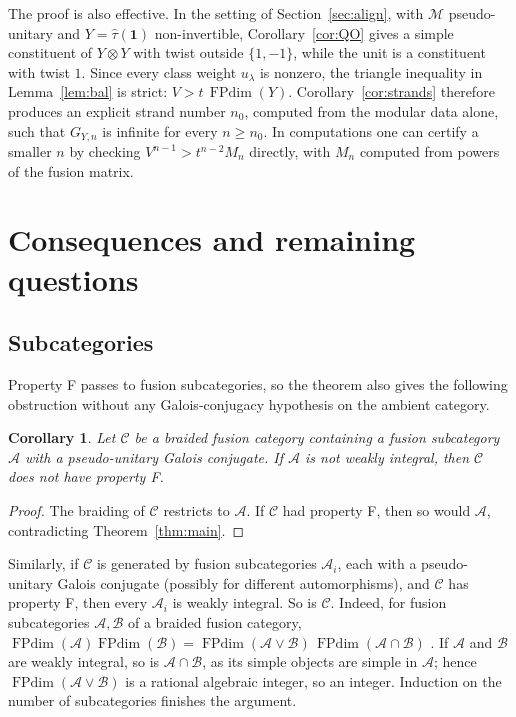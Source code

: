 \documentclass[11pt,oneside]{amsart}
\newtheorem{corollary}[theorem]{Corollary}
\theoremstyle{remark}
\newcommand{\C}{\mathcal C}
\newcommand{\M}{\mathcal M}
\newcommand{\one}{\mathbf 1}
\newcommand{\FP}{\operatorname{FPdim}}
\newcommand{\htau}{\hat\tau}
\begin{document}
The proof is also effective. In the setting of Section~\ref{sec:align}, with
$\M$ pseudo-unitary and $Y=\htau(\one)$ non-invertible, Corollary~\ref{cor:QO}
gives a simple constituent of $Y\otimes Y$ with twist outside $\{1,-1\}$, while
the unit is a constituent with twist $1$. Since every class weight $u_\lambda$
is nonzero, the triangle inequality in Lemma~\ref{lem:bal} is strict:
$V>t\,\FP(Y)$. Corollary~\ref{cor:strands} therefore produces an explicit strand
number $n_0$, computed from the modular data alone, such that $G_{Y,n}$ is
infinite for every $n\ge n_0$. In computations one can certify a smaller $n$ by
checking $V^{n-1}>t^{n-2}M_n$ directly, with $M_n$ computed from powers of the
fusion matrix.

\section{Consequences and remaining questions}\label{sec:conseq}

\subsection{Subcategories}
Property F passes to fusion subcategories, so the theorem also gives the
following obstruction without any Galois-conjugacy hypothesis on the ambient
category.

\begin{corollary}
Let $\C$ be a braided fusion category containing a fusion subcategory $\mathcal A$
with a pseudo-unitary Galois conjugate. If $\mathcal A$ is not weakly integral,
then $\C$ does not have property F.
\end{corollary}

\begin{proof}
The braiding of $\C$ restricts to $\mathcal A$. If $\C$ had property F, then
so would $\mathcal A$, contradicting Theorem~\ref{thm:main}.
\end{proof}

Similarly, if $\C$ is generated by fusion subcategories $\mathcal A_i$, each with
a pseudo-unitary Galois conjugate (possibly for different automorphisms), and
$\C$ has property F, then every $\mathcal A_i$ is weakly integral. So is $\C$.
Indeed, for fusion subcategories $\mathcal A,\mathcal B$ of a braided fusion
category, $\FP(\mathcal A)\FP(\mathcal B)=\FP(\mathcal A\vee\mathcal B)\,
\FP(\mathcal A\cap\mathcal B)$ \cite[Lemma~3.38]{DGNO}. If $\mathcal A$ and
$\mathcal B$ are weakly integral, so is $\mathcal A\cap\mathcal B$, as its simple
objects are simple in $\mathcal A$; hence $\FP(\mathcal A\vee\mathcal B)$ is a
rational algebraic integer, so an integer. Induction on the number of
subcategories finishes the argument.
\end{document}
